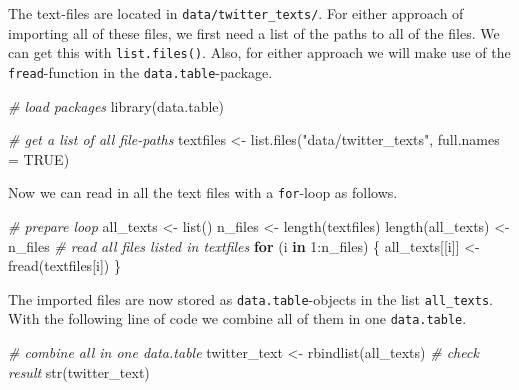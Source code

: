 \documentclass[
  12pt,
]{style/krantz}
\newenvironment{Shaded}{\begin{snugshade}}{\end{snugshade}}
\newcommand{\AttributeTok}[1]{\textcolor[rgb]{0.77,0.63,0.00}{#1}}
\newcommand{\CommentTok}[1]{\textcolor[rgb]{0.56,0.35,0.01}{\textit{#1}}}
\newcommand{\ConstantTok}[1]{\textcolor[rgb]{0.00,0.00,0.00}{#1}}
\newcommand{\ControlFlowTok}[1]{\textcolor[rgb]{0.13,0.29,0.53}{\textbf{#1}}}
\newcommand{\DecValTok}[1]{\textcolor[rgb]{0.00,0.00,0.81}{#1}}
\newcommand{\FunctionTok}[1]{\textcolor[rgb]{0.00,0.00,0.00}{#1}}
\newcommand{\NormalTok}[1]{#1}
\newcommand{\OtherTok}[1]{\textcolor[rgb]{0.56,0.35,0.01}{#1}}
\newcommand{\SpecialCharTok}[1]{\textcolor[rgb]{0.00,0.00,0.00}{#1}}
\newcommand{\StringTok}[1]{\textcolor[rgb]{0.31,0.60,0.02}{#1}}
\begin{document}
The text-files are located in \texttt{data/twitter\_texts/}. For either approach of importing all of these files, we first need a list of the paths to all of the files. We can get this with \texttt{list.files()}. Also, for either approach we will make use of the \texttt{fread}-function in the \texttt{data.table}-package.

\begin{Shaded}
\begin{Highlighting}[]
\CommentTok{\# load packages}
\FunctionTok{library}\NormalTok{(data.table)}

\CommentTok{\# get a list of all file{-}paths}
\NormalTok{textfiles }\OtherTok{\textless{}{-}} \FunctionTok{list.files}\NormalTok{(}\StringTok{"data/twitter\_texts"}\NormalTok{, }\AttributeTok{full.names =} \ConstantTok{TRUE}\NormalTok{)}
\end{Highlighting}
\end{Shaded}

Now we can read in all the text files with a \texttt{for}-loop as follows.

\begin{Shaded}
\begin{Highlighting}[]
\CommentTok{\# prepare loop}
\NormalTok{all\_texts }\OtherTok{\textless{}{-}} \FunctionTok{list}\NormalTok{()}
\NormalTok{n\_files }\OtherTok{\textless{}{-}} \FunctionTok{length}\NormalTok{(textfiles)}
\FunctionTok{length}\NormalTok{(all\_texts) }\OtherTok{\textless{}{-}}\NormalTok{ n\_files}
\CommentTok{\# read all files listed in textfiles}
\ControlFlowTok{for}\NormalTok{ (i }\ControlFlowTok{in} \DecValTok{1}\SpecialCharTok{:}\NormalTok{n\_files) \{}
\NormalTok{     all\_texts[[i]] }\OtherTok{\textless{}{-}} \FunctionTok{fread}\NormalTok{(textfiles[i])}
\NormalTok{\}}
\end{Highlighting}
\end{Shaded}

The imported files are now stored as \texttt{data.table}-objects in the list \texttt{all\_texts}. With the following line of code we combine all of them in one \texttt{data.table}.

\begin{Shaded}
\begin{Highlighting}[]
\CommentTok{\# combine all in one data.table}
\NormalTok{twitter\_text }\OtherTok{\textless{}{-}} \FunctionTok{rbindlist}\NormalTok{(all\_texts)}
\CommentTok{\# check result}
\FunctionTok{str}\NormalTok{(twitter\_text)}
\end{Highlighting}
\end{Shaded}
\end{document}
